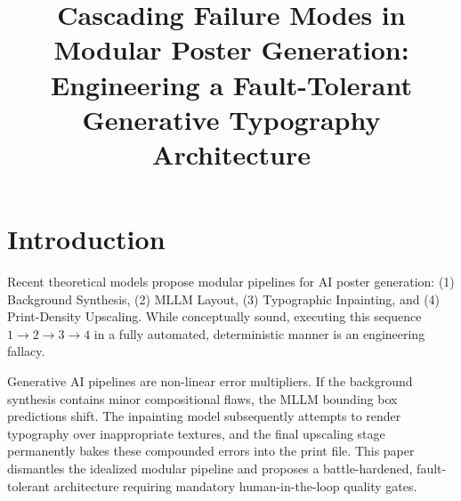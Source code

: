\documentclass[10pt,journal,compsoc]{IEEEtran}
\begin{document}
\title{Cascading Failure Modes in Modular Poster Generation: Engineering a Fault-Tolerant Generative Typography Architecture}


\maketitle
\IEEEdisplaynontitleabstractindextext
\IEEEpeerreviewmaketitle


\newtheorem{theorem}{Theorem}
\newtheorem{lemma}{Lemma}
\newtheorem{definition}{Definition}

\section{Introduction}
Recent theoretical models propose modular pipelines for AI poster generation: (1) Background Synthesis, (2) MLLM Layout, (3) Typographic Inpainting, and (4) Print-Density Upscaling. While conceptually sound, executing this sequence $1 \to 2 \to 3 \to 4$ in a fully automated, deterministic manner is an engineering fallacy.

Generative AI pipelines are non-linear error multipliers. If the background synthesis contains minor compositional flaws, the MLLM bounding box predictions shift. The inpainting model subsequently attempts to render typography over inappropriate textures, and the final upscaling stage permanently bakes these compounded errors into the print file. This paper dismantles the idealized modular pipeline and proposes a battle-hardened, fault-tolerant architecture requiring mandatory human-in-the-loop quality gates.
\end{document}
